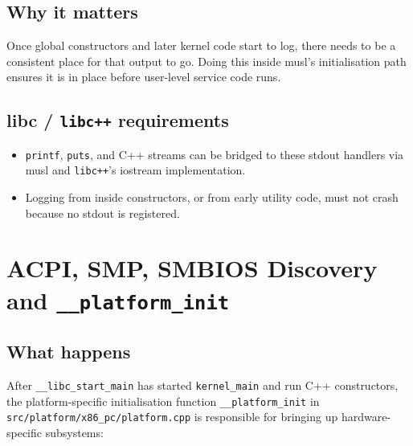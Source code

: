 \documentclass[a4paper,11pt]{article}
\begin{document}
\subsection{Why it matters}

Once global constructors and later kernel code start to log, there needs
to be a consistent place for that output to go. Doing this inside musl’s
initialisation path ensures it is in place before user-level service
code runs.

\subsection{libc / \texorpdfstring{\texttt{libc++}}{libc++} requirements}

\begin{itemize}
  \item \texttt{printf}, \texttt{puts}, and C++ streams can be bridged to
        these stdout handlers via musl and \texttt{libc++}'s iostream
        implementation.
  \item Logging from inside constructors, or from early utility code,
        must not crash because no stdout is registered.
\end{itemize}

\section{ACPI, SMP, SMBIOS Discovery and \texttt{\_\_platform\_init}}

\subsection{What happens}

After \texttt{\_\_libc\_start\_main} has started \texttt{kernel\_main} and
run C++ constructors, the platform-specific initialisation function
\texttt{\_\_platform\_init} in \texttt{src/platform/x86\_pc/platform.cpp}
is responsible for bringing up hardware-specific subsystems:
\end{document}
